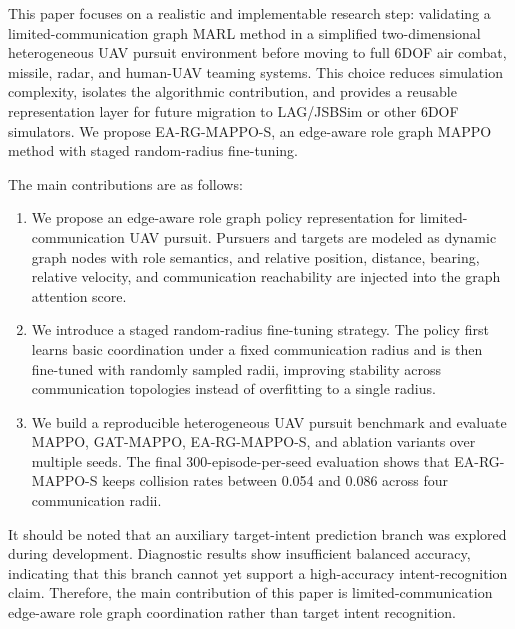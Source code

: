 This paper focuses on a realistic and implementable research step: validating a limited-communication graph MARL method in a simplified two-dimensional heterogeneous UAV pursuit environment before moving to full 6DOF air combat, missile, radar, and human-UAV teaming systems. This choice reduces simulation complexity, isolates the algorithmic contribution, and provides a reusable representation layer for future migration to LAG/JSBSim or other 6DOF simulators. We propose EA-RG-MAPPO-S, an edge-aware role graph MAPPO method with staged random-radius fine-tuning.

The main contributions are as follows:
\begin{enumerate}
    \item We propose an edge-aware role graph policy representation for limited-communication UAV pursuit. Pursuers and targets are modeled as dynamic graph nodes with role semantics, and relative position, distance, bearing, relative velocity, and communication reachability are injected into the graph attention score.
    \item We introduce a staged random-radius fine-tuning strategy. The policy first learns basic coordination under a fixed communication radius and is then fine-tuned with randomly sampled radii, improving stability across communication topologies instead of overfitting to a single radius.
    \item We build a reproducible heterogeneous UAV pursuit benchmark and evaluate MAPPO, GAT-MAPPO, EA-RG-MAPPO-S, and ablation variants over multiple seeds. The final 300-episode-per-seed evaluation shows that EA-RG-MAPPO-S keeps collision rates between 0.054 and 0.086 across four communication radii.
\end{enumerate}

It should be noted that an auxiliary target-intent prediction branch was explored during development. Diagnostic results show insufficient balanced accuracy, indicating that this branch cannot yet support a high-accuracy intent-recognition claim. Therefore, the main contribution of this paper is limited-communication edge-aware role graph coordination rather than target intent recognition.
